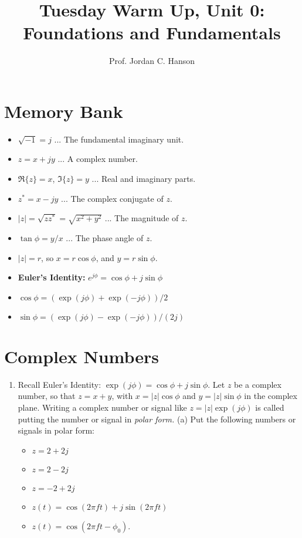 \documentclass{article}
\begin{document}
\twocolumn

\title{Tuesday Warm Up, Unit 0: Foundations and Fundamentals}
\author{Prof. Jordan C. Hanson}
\maketitle

\section{Memory Bank}

\begin{itemize}
\item $\sqrt{-1} = j$ ... The fundamental imaginary unit.
\item $z = x + jy$ ... A complex number.
\item $\Re \lbrace z \rbrace = x$, $\Im \lbrace z \rbrace = y$ ... Real and imaginary parts.
\item $z^{*} = x - j y$ ... The complex conjugate of $z$.
\item $|z| = \sqrt{z z^{*}} = \sqrt{x^2 + y^2}$ ... The magnitude of $z$.
\item $\tan\phi = y/x$ ... The phase angle of $z$.
\item $|z| = r$, so $x = r\cos\phi$, and $y = r\sin\phi$.
\item \textbf{Euler's Identity:} $e^{j\phi} = \cos\phi + j\sin\phi$
\item $\cos\phi = (\exp(j\phi) + \exp(-j\phi))/2$
\item $\sin\phi = (\exp(j\phi) - \exp(-j\phi))/(2j)$
\end{itemize}

\section{Complex Numbers}

\begin{enumerate}
\item Recall Euler's Identity: $\exp(j\phi) = \cos\phi + j\sin\phi$.  Let $z$ be a complex number, so that $z = x +  y$, with $x = |z|\cos\phi$ and $y=|z|\sin\phi$ in the complex plane.  Writing a complex number or signal like $z = |z|\exp(j\phi)$ is called putting the number or signal in \textit{polar form.} (a) Put the following numbers or signals in polar form:
\begin{itemize}
\item $z = 2 + 2j$
\item $z = 2 - 2j$
\item $z = -2 + 2j$
\item $z(t) = \cos(2\pi f t) + j\sin(2\pi f t)$
\item $z(t) = \cos(2\pi f t - \phi_0)$.
\end{itemize} \vspace{4cm}
\end{enumerate}
\end{document}
